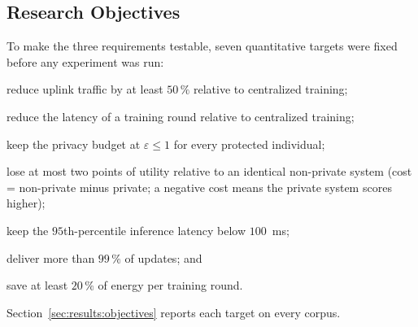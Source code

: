 \subsection{Research Objectives}
To make the three requirements testable, seven quantitative targets were fixed
before any experiment was run:
\begin{IEEEdescription}[\IEEEsetlabelwidth{O2b:}]
\item[O1:] reduce uplink traffic by at least $50\,\%$ relative to centralized
training;
\item[O1b:] reduce the latency of a training round relative to centralized
training;
\item[O2a:] keep the privacy budget at $\varepsilon \le 1$ for every protected
individual;
\item[O2b:] lose at most two points of utility relative to an identical
non-private system (cost = non-private minus private; a negative cost means
the private system scores higher);
\item[O3a:] keep the $95$th-percentile inference latency below $100$~ms;
\item[O3b:] deliver more than $99\,\%$ of updates; and
\item[O4:] save at least $20\,\%$ of energy per training round.
\end{IEEEdescription}
Section~\ref{sec:results:objectives} reports each target on every corpus.
